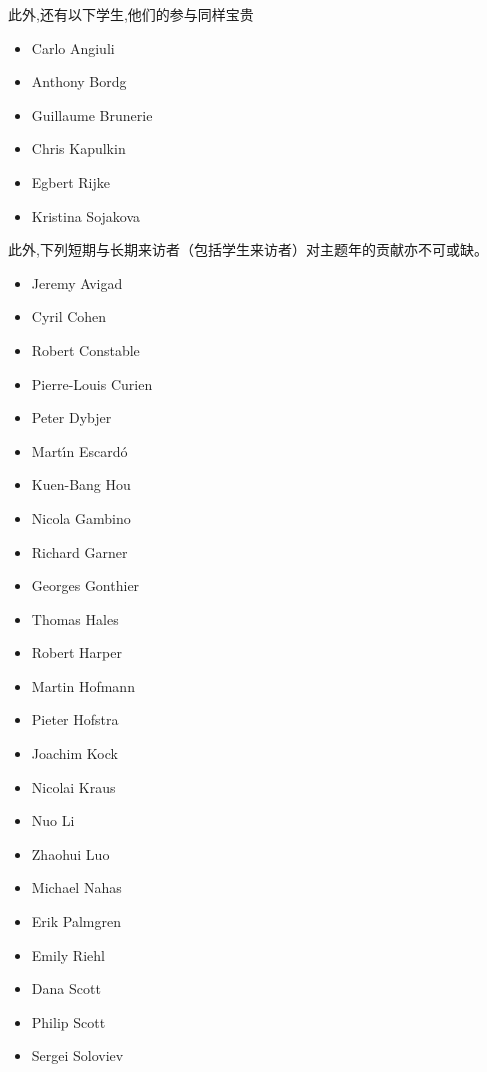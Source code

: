 \noindent 此外,还有以下学生,他们的参与同样宝贵

\begin{multicols}{\OPTprefacecols}{
\begin{itemize}
\item[] Carlo Angiuli
\item[] Anthony Bordg
\item[] Guillaume Brunerie
\item[] Chris Kapulkin
\item[] Egbert Rijke
\item[] Kristina Sojakova
\end{itemize}
}
\end{multicols}

\noindent 此外,下列短期与长期来访者（包括学生来访者）对主题年的贡献亦不可或缺。

\begin{multicols}{\OPTprefacecols}{
\begin{itemize}
\item[] Jeremy Avigad
\item[] Cyril Cohen
\item[] Robert Constable
\item[] Pierre-Louis Curien
\item[] Peter Dybjer
\item[] Mart{\'\i}n Escard{\'o}
\item[] Kuen-Bang Hou
\item[] Nicola Gambino
\item[] Richard Garner
\item[] Georges Gonthier
\item[] Thomas Hales
\item[] Robert Harper
\item[] Martin Hofmann
\item[] Pieter Hofstra
\item[] Joachim Kock
\item[] Nicolai Kraus
\item[] Nuo Li
\item[] Zhaohui Luo
\item[] Michael Nahas
\item[] Erik Palmgren
\item[] Emily Riehl
\item[] Dana Scott
\item[] Philip Scott
\item[] Sergei Soloviev
\end{itemize}
}
\end{multicols}

